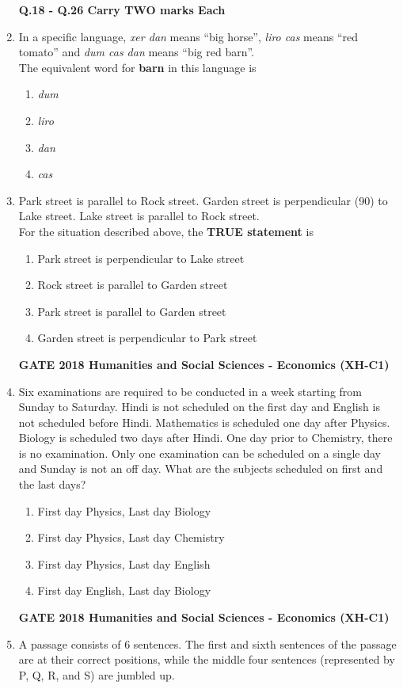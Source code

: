 \documentclass[journal,12pt,onecolumn]{exam}
\theoremstyle{remark}
\begin{document}
\begin{enumerate}
\textbf{Q.18 - Q.26 Carry TWO marks Each}
\item In a specific language, \textit{xer dan} means ``big horse'', \textit{liro cas} means ``red tomato'' and \textit{dum cas dan} means ``big red barn''. \\

  The equivalent word for \textbf{barn} in this language is \
  
  \begin{enumerate}
    \item \textit{dum}
    \item \textit{liro}
    \item \textit{dan}
    \item \textit{cas}
  \end{enumerate}
  
  \item Park street is parallel to Rock street. Garden street is perpendicular (90\degree) to Lake street. Lake street is parallel to Rock street. \\
  
  For the situation described above, the \textbf{TRUE statement} is \

  \begin{enumerate}
    \item Park street is perpendicular to Lake street
    \item Rock street is parallel to Garden street
    \item Park street is parallel to Garden street
    \item Garden street is perpendicular to Park street
  \end{enumerate}
\textbf{GATE 2018 Humanities and Social Sciences - Economics (XH-C1)}
 \item Six examinations are required to be conducted in a week starting from Sunday to Saturday. Hindi is not scheduled on the first day and English is not scheduled before Hindi. Mathematics is scheduled one day after Physics. Biology is scheduled two days after Hindi. One day prior to Chemistry, there is no examination. Only one examination can be scheduled on a single day and Sunday is not an off day. What are the subjects scheduled on first and the last days? \\
  
 
  \begin{enumerate}
    \item First day Physics, Last day Biology
    \item First day Physics, Last day Chemistry
    \item First day Physics, Last day English
    \item First day English, Last day Biology
  \end{enumerate}
  \newpage
  \textbf{GATE 2018 Humanities and Social Sciences - Economics (XH-C1)}
   \item A passage consists of 6 sentences. The first and sixth sentences of the passage are at their correct positions, while the middle four sentences (represented by P, Q, R, and S) are jumbled up.


\end{enumerate}
\end{document}

